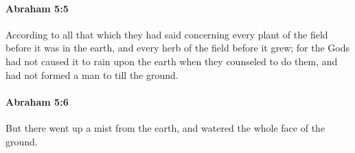 
		\paragraph{Abraham 5:5} %
			\label{ABRAHAM-5-5}

			According to all that which they had said concerning every plant of the field before it was in the earth, and every herb of the field before it grew; for the Gods had not caused it to rain upon the earth when they counseled to do them, and had not formed a man to till the ground.


		\paragraph{Abraham 5:6} %
			\label{ABRAHAM-5-6}

			But there went up a mist from the earth, and watered the whole face of the ground.


